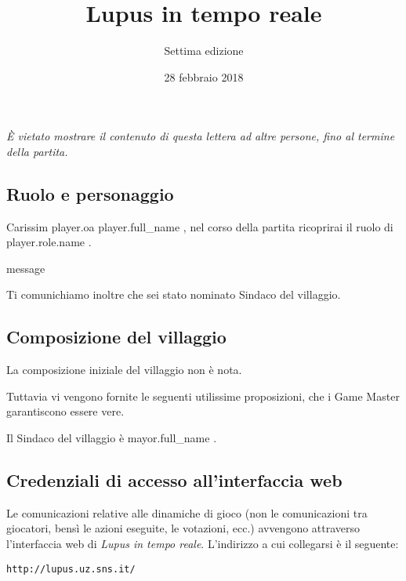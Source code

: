 \documentclass[a4paper,10pt]{article}
\title{Lupus in tempo reale}
\author{Settima edizione}
\date{28 febbraio 2018}
\begin{document}

\maketitle

\emph{È vietato mostrare il contenuto di questa lettera ad altre persone, fino al termine della partita.}


\subsection*{Ruolo e personaggio}
Carissim{{ player.oa }} {{ player.full_name }}, nel corso della partita ricoprirai il ruolo di {{ player.role.name }}.

{%

{%
    {%
        {{ message }}
    {%
{%

{%
    Ti comunichiamo inoltre che sei stato nominato Sindaco del villaggio.
{%


\subsection*{Composizione del villaggio}
La composizione iniziale del villaggio non è nota.
{%
Tuttavia vi vengono fornite le seguenti utilissime proposizioni, che i Game Master garantiscono essere vere.
\nopagebreak
{}
{%

Il Sindaco del villaggio è {{ mayor.full_name }}.


\subsection*{Credenziali di accesso all'interfaccia web}

Le comunicazioni relative alle dinamiche di gioco (non le comunicazioni tra giocatori, bensì le azioni eseguite, le votazioni, ecc.) avvengono attraverso l'interfaccia web di \emph{Lupus in tempo reale}.
L'indirizzo a cui collegarsi è il seguente:
\nopagebreak
\begin{center}
    \verb|http://lupus.uz.sns.it/|
\end{center}

}}}}}}}}}
\end{document}
